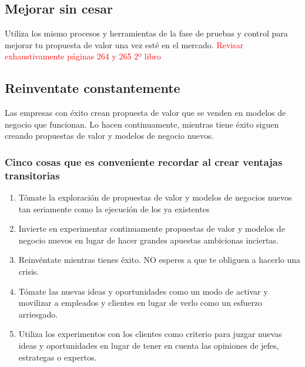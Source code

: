 \documentclass[11pt]{book}
\begin{document}
\subsection{Mejorar sin cesar}
Utiliza los mismo procesos y herramientas de la fase de pruebas y control para mejorar tu propuesta de valor una vez esté en el mercado.
\textcolor{red}{Revisar exhaustivamente páginas 264 y  265 2º libro}
\subsection{Reinventate constantemente}
Las empresas con éxito crean propuesta de valor que se venden en modelos de negocio que funcionan. Lo hacen continuamente, mientras tiene éxito siguen creando propuestas de valor y modelos de negocio nuevos.
\subsubsection{Cinco cosas que es conveniente recordar al crear ventajas transitorias}
\begin{enumerate}
\item Tómate la exploración de propuestas de valor y modelos de negocios nuevos tan seriamente como la ejecución de los ya existentes
\item Invierte en experimentar continuamente propuestas de valor y modelos de negocio nuevos en lugar de hacer grandes apuestas ambicionas inciertas.
\item Reinvéntate mientras tienes éxito. NO esperes a que te obliguen a hacerlo una crisis.
\item Tómate las nuevas ideas y oportunidades como un modo de activar y movilizar a empleados y clientes en lugar de verlo como un esfuerzo arriesgado.
\item Utiliza los experimentos con los clientes como criterio para juzgar nuevas ideas y oportunidades en lugar de tener en cuenta las opiniones de jefes, estrategas o expertos.
\end{enumerate}
\end{document}

